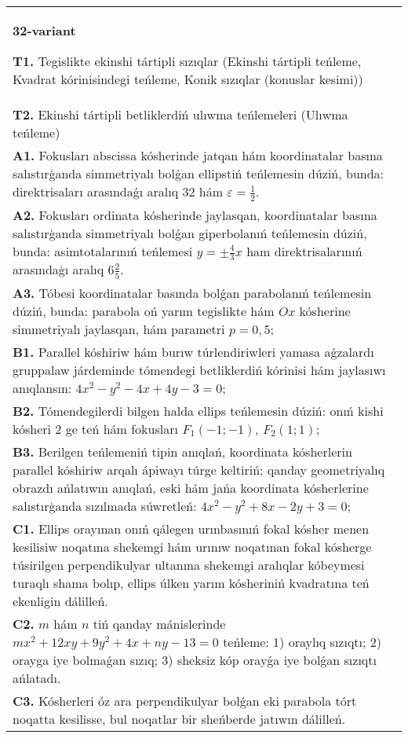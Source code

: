 \documentclass{article}
\begin{document}
\begin{tabular}{m{17cm}}
\textbf{32-variant}
\newline

\textbf{T1.} Tegislikte ekinshi tártipli sızıqlar (Ekinshi tártipli teńleme, Kvadrat kórinisindegi teńleme, Konik sızıqlar (konuslar kesimi)) \\
\textbf{T2.} Ekinshi tártipli betliklerdiń ulıwma teńlemeleri (Ulıwma teńleme) \\
\textbf{A1.} Fokusları abscissa kósherinde jatqan hám koordinatalar basına salıstırģanda simmetriyalı bolǵan ellipstiń teńlemesin dúziń, bunda: direktrisaları arasındaǵı aralıq 32 hám $\varepsilon=\frac{1}{2}$. \\
\textbf{A2.} Fokusları ordinata kósherinde jaylasqan, koordinatalar basına salıstırģanda simmetriyalı bolǵan giperbolanıń teńlemesin dúziń, bunda: asimtotalarınıń teńlemesi $y= \pm \frac{4}{3} x$ ham direktrisalarınıń arasındaģı aralıq $6 \frac{2}{5}$. \\
\textbf{A3.} Tóbesi koordinatalar basında bolǵan parabolanıń teńlemesin dúziń, bunda: parabola oń yarım tegislikte hám $Ox$ kósherine simmetriyalı jaylasqan, hám parametri $p=0,5$; \\
\textbf{B1.} Parallel kóshiriw hám burıw túrlendiriwleri yamasa aǵzalardı gruppalaw járdeminde tómendegi betliklerdiń kórinisi hám jaylasıwı anıqlansın: $4 x^2-y^2-4 x+4 y-3=0$; \\
\textbf{B2.} Tómendegilerdi bilgen halda ellips teńlemesin dúziń: onıń kishi kósheri 2 ge teń hám fokusları $F_1 (-1;-1) $, $F_2 (1; 1) $; \\
\textbf{B3.} Berilgen teńlemeniń tipin anıqlań, koordinata kósherlerin parallel kóshiriw arqalı ápiwayı túrge keltiriń; qanday geometriyalıq obrazdı ańlatıwın anıqlań, eski hám jańa koordinata kósherlerine salıstırģanda sızılmada súwretleń: $4 x^2-y^2+8 x-2 y+3=0$; \\
\textbf{C1.} Ellips orayınan onıń qálegen urınbasınıń fokal kósher menen kesilisiw noqatına shekemgi hám urınıw noqatınan fokal kósherge túsirilgen perpendikulyar ultanına shekemgi aralıqlar kóbeymesi turaqlı shama bolıp, ellips úlken yarım kósheriniń kvadratına teń ekenligin dálilleń. \\
\textbf{C2.} $m$ hám $n$ tiń qanday mánislerinde $m x^2+12 x y+9 y^2+4 x+n y-13=0$ teńleme: 1) oraylıq sızıqtı; 2) orayga iye bolmaǵan sızıq; 3) sheksiz kóp orayǵa iye bolǵan sızıqtı ańlatadı. \\
\textbf{C3.} Kósherleri óz ara perpendikulyar bolǵan eki parabola tórt noqatta kesilisse, bul noqatlar bir sheńberde jatıwın dálilleń. \\

\end{tabular}
\vspace{1cm}
\end{document}
